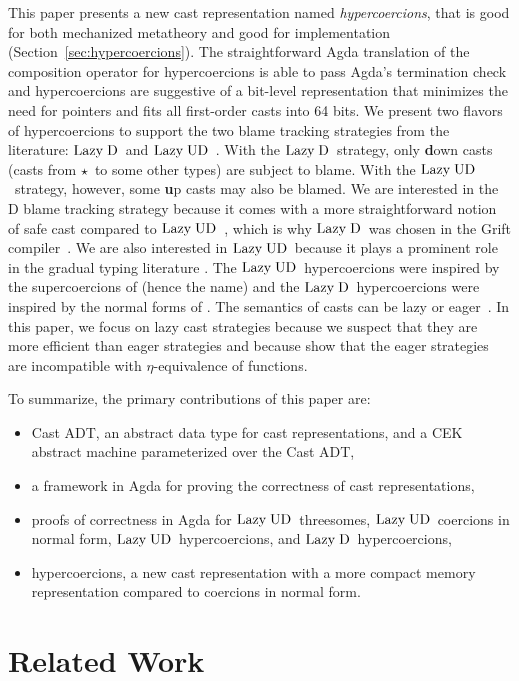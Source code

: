 \documentclass[runningheads]{llncs}
\newcommand{\LUD}{\ensuremath{\text{Lazy\;UD}}}
\newcommand{\LD}{\ensuremath{\text{Lazy\;D}}}
\newcommand{\Tdyn}[0]{\ensuremath{\star}}
\begin{document}
This paper presents a new cast representation named
\emph{hypercoercions}, that is good for both mechanized metatheory and
good for implementation (Section~\ref{sec:hypercoercions}). The
straightforward Agda translation of the composition operator for
hypercoercions is able to pass Agda's termination check and
hypercoercions are suggestive of a bit-level representation that
minimizes the need for pointers and fits all first-order casts into 64
bits.
%
We present two flavors of hypercoercions to support the two blame
tracking strategies from the literature: \LD\ and
\LUD~\citep{siek2009exploring}. With the \LD\ strategy, only 
\textbf{d}own 
casts (casts from \Tdyn\ to some other types) are subject to blame. 
With the 
\LUD\
strategy, however, some \textbf{u}p casts may also be blamed.
We are interested in the D blame
tracking strategy because it comes with a more straightforward notion of
safe cast compared to \LUD~\citep{siek2009exploring}, which is why \LD\ 
was
chosen in the Grift compiler~\citep{kuhlenschmidt2018efficient}. We are also 
interested in \LUD\ because it plays a
prominent role in the gradual typing literature
\citep{wadler2009well}.  The \LUD\ hypercoercions were inspired by the
supercoercions of \citep{Garcia:2013:CTB:2500365.2500603} (hence the name) and
the \LD\ hypercoercions were inspired by the normal forms of
\citet{siek2012interpretations}.
The semantics of casts can be lazy or
eager~\citep{siek2009exploring}. In this paper, we focus on lazy cast
strategies because we suspect that they are more efficient than eager
strategies and because \citet{new2019gradual} show that the eager
strategies are incompatible with $\eta$-equivalence of functions.

To summarize, the primary contributions of this paper are:
\begin{itemize}
\item Cast ADT, an abstract data type for cast representations, and a
  CEK abstract machine parameterized over the Cast ADT,
\item a framework in Agda for proving the correctness of cast
  representations,
\item proofs of correctness in Agda for \LUD\ threesomes,
  \LUD\ coercions in normal form, \LUD\ hypercoercions, and
  \LD\ hypercoercions, 
\item hypercoercions, a new cast representation with a more compact
  memory representation compared to coercions in normal form.
\end{itemize}


\section{Related Work}
\label{chap:related-works}
\end{document}

